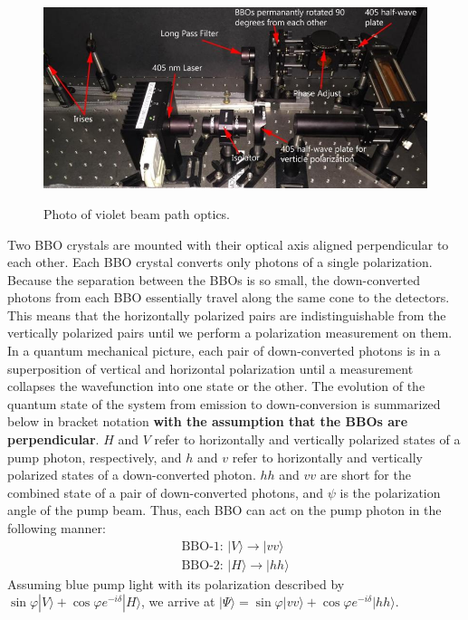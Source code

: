 \documentclass{../lab}
\begin{document}
\begin{figure}[h]
    \centering
    \href{http://experimentationlab.berkeley.edu/sites/default/files/qie_optics_image_0.jpg}{\includegraphics[width=0.7\linewidth]{images/qie_optics_image_0.jpg}}
    \caption{Photo of violet beam path optics.}
    \label{fig:qie_optics_image_0}
\end{figure}

Two BBO crystals are mounted with their optical axis aligned perpendicular to each other. Each BBO crystal converts only photons of a single polarization. Because the separation between the BBOs is so small, the down-converted photons from each BBO essentially travel along the same cone to the detectors. This means that the horizontally polarized pairs are indistinguishable from the vertically polarized pairs until we perform a polarization measurement on them. In a quantum mechanical picture, each pair of down-converted photons is in a superposition of vertical and horizontal polarization until a measurement collapses the wavefunction into one state or the other. The evolution of the quantum state of the system from emission to down-conversion is summarized below in bracket notation \textbf{with the assumption that the BBOs are perpendicular}. $H$ and $V$ refer to horizontally and vertically polarized states of a pump photon, respectively, and $h$ and $v$ refer to horizontally and vertically polarized states of a down-converted photon. $hh$ and $vv$ are short for the combined state of a pair of down-converted photons, and $\psi$ is the polarization angle of the pump beam. Thus, each BBO can act on the pump photon in the following manner:
\begin{gather*}
    \text{BBO-1: } |V\rangle \rightarrow  |vv\rangle \\
    \text{BBO-2: } |H\rangle \rightarrow  |hh\rangle 
\end{gather*}
Assuming blue pump light with its polarization described by $\sin \varphi |V\rangle + \cos\varphi e^{-i\delta} |H\rangle$, we arrive at $|\Psi\rangle = \sin\varphi |vv\rangle + \cos\varphi e^{-i\delta} |hh\rangle$.
\end{document}
